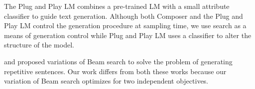 The Plug and Play LM
\cite{dathathri2019plug} combines a pre-trained LM
with a small attribute classifier to guide text generation.
Although both Composer and the Plug and Play LM control the generation procedure at sampling time, we use search as a means of generation control while Plug and Play LM uses a classifier to alter the structure of the model. %


\cite{vijayakumar2018diverse} and \cite{Kool2019SBS} proposed variations of Beam search
to solve the problem of generating repetitive sentences.
Our work differs from both these works because our variation of Beam search optimizes for two independent objectives.

